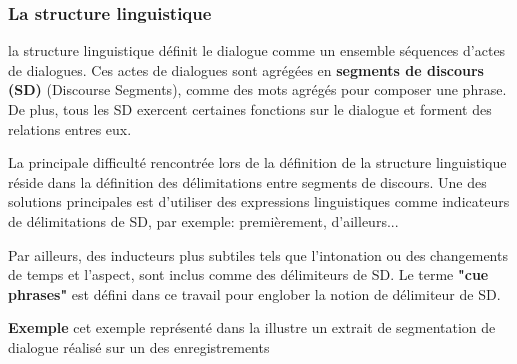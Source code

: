 \documentclass[a4paper,french]{article}
\begin{document}
\subsubsection{La structure linguistique} la structure linguistique définit le dialogue comme un ensemble séquences d'actes de dialogues. Ces actes de dialogues sont agrégées en \textbf{segments de discours (SD)} (Discourse Segments), comme des mots agrégés pour composer une phrase. De plus, tous les SD exercent certaines fonctions sur le dialogue et forment des relations entres eux.  
\par La principale difficulté rencontrée lors de la définition de la structure linguistique réside dans la définition des délimitations entre segments de discours. Une des solutions principales est d'utiliser des expressions linguistiques comme indicateurs de délimitations de SD, par exemple: premièrement, d'ailleurs... 
\par Par ailleurs, des inducteurs plus subtiles tels que l'intonation ou des changements de temps et l'aspect, sont inclus comme des délimiteurs de SD. Le terme \textbf{"cue phrases"} est défini dans ce travail pour englober la notion de délimiteur de SD. 

\textbf{Exemple} cet exemple représenté dans la  illustre un extrait de segmentation de dialogue réalisé sur un des enregistrements

\begin{figure}
	\vskip 8pt
\end{figure}
\end{document}
